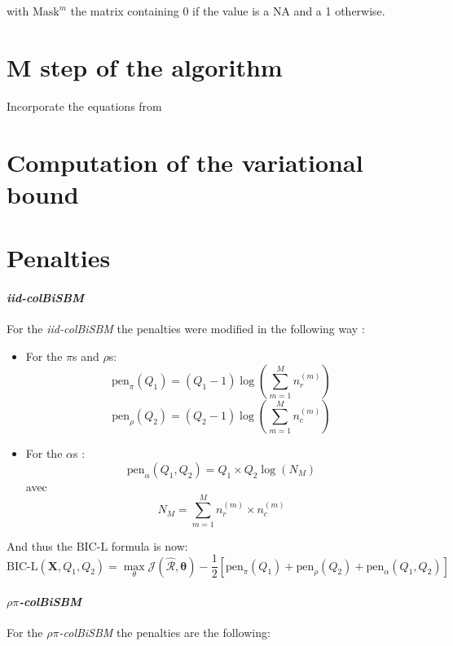 \documentclass[12pt,a4paper]{report}
\begin{document}
with $\text{Mask}^{m}$ the matrix containing $0$ if the value is a NA and a 1
otherwise.

\section{M step of the algorithm}

Incorporate the equations from \parencite{chabert-liddellLearningCommonStructures2023}

\section{Computation of the variational bound}

\section{Penalties}

\paragraph*{\textit{iid-colBiSBM}}
For the \textit{iid-colBiSBM} the penalties were modified in the following way :

\begin{itemize}
    \item For the $\pi$s and $\rho$s:
    \[\text{pen}_{\pi}(Q_1) = (Q_1 - 1)\log(\sum_{m=1}^{M}n_{r}^{(m)})\]
    \[\text{pen}_{\rho}(Q_2) = (Q_2 - 1)\log(\sum_{m=1}^{M}n_{c}^{(m)})\]
    \item For the $\alpha$s :
    \[\text{pen}_{\alpha}(Q_1, Q_2) = Q_1 \times Q_2 \log(N_M)\]
    avec
    \[ N_M = \sum_{m = 1}^{M} n_{r}^{(m)} \times n_{c}^{(m)} \]
\end{itemize}
And thus the $\text{BIC-L}$ formula is now:
\[ \text{BIC-L}(\bm{X},Q_1, Q_2) = \max_{\theta} \mathcal{J} (\mathcal{\hat{R}}, \bm{\theta}) 
- \frac{1}{2} [\text{pen}_{\pi}(Q_1) + \text{pen}_{\rho}(Q_2) + \text{pen}_{\alpha}(Q_1, Q_2)]\]

\paragraph*{\textit{$\rho\pi$-colBiSBM}}
For the \textit{$\rho\pi$-colBiSBM} the penalties are the following:
\end{document}

